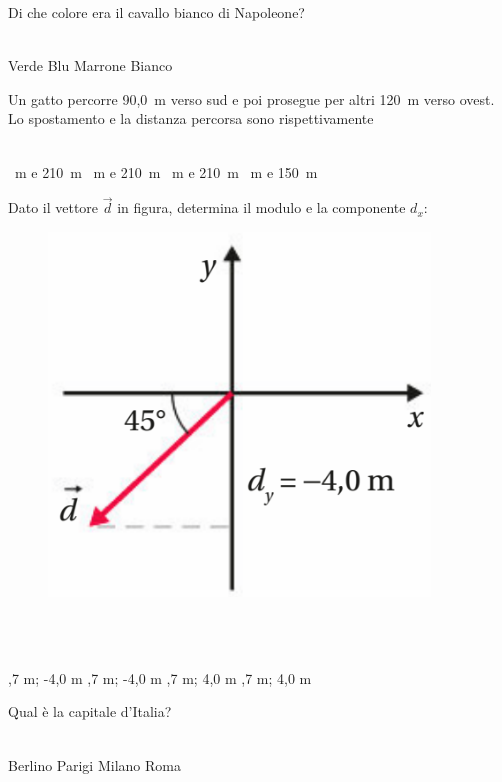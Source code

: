 \documentclass[a4paper,11pt]{exam}
\begin{document}
\begin{questions}
    
\question Di che colore era il cavallo bianco di Napoleone?\\\
\begin{oneparchoices}
  \choice Verde
  \choice Blu 
  \choice Marrone
  \choice Bianco
\end{oneparchoices}

    
\question Un gatto percorre 90,0~m verso sud e poi prosegue per altri 120~m verso ovest. Lo spostamento e la distanza percorsa sono rispettivamente\\\
\begin{oneparchoices}
  \choice 30~m e 210~m
  ~m e 210~m
  ~m e 210~m
  \choice 210~m e 150~m
\end{oneparchoices}

    
\question Dato il vettore $\vec{d}$ in figura, determina il modulo e la componente $d_x$: \begin{figure}[h!]   \begin{center}     \includegraphics[scale=0.35]{vettored.png}   \end{center} \end{figure}\\\
\begin{oneparchoices}
  ,7 m; -4,0 m
  ,7 m; -4,0 m
  \choice -5,7 m; 4,0 m
  \choice 5,7 m; 4,0 m
\end{oneparchoices}

    
\question Qual è la capitale d’Italia?\\\
\begin{oneparchoices}
  \choice Berlino
  \choice Parigi
  \choice Milano
  \choice Roma
\end{oneparchoices}


\end{questions}
\end{document}
